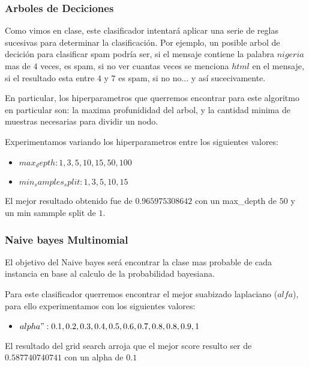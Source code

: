 \subsubsection{Arboles de Deciciones}

Como vimos en clase, este clasificador intentará aplicar una serie de reglas sucesivas para determinar la clasificación. Por ejemplo, un posible arbol de decición para clasificar spam podría ser, si el mensaje contiene la palabra $nigeria$ mas de $4$ veces, es spam, si no ver cuantas veces se menciona $html$ en el mensaje, si el resultado esta entre $4$ y $7$ es spam, si no no... y así sucecivamente.

En particular, los hiperparametros que querremos encontrar para este algoritmo en particular son: la maxima profunididad del arbol, y la cantidad minima de muestras necesarias para dividir un nodo.

Experimentamos variando los hiperparametros entre los siguientes valores:

\begin{itemize}
\item $max_depth: 1,3,5,10,15,50,100$ 
\item $min_samples_split: 1,3,5,10,15$
\end{itemize}

El mejor resultado obtenido fue de $0.965975308642$ con un max_depth de $50$ y un min sammple split de $1$.

\terminar


\subsubsection{Naive bayes Multinomial}

El objetivo del Naive bayes será encontrar la clase mas probable de cada instancia en base al calculo de la probabilidad bayesiana. 

Para este clasificador querremos encontrar el mejor suabizado laplaciano ($alfa$), para ello experimentamos con los siguientes valores:
\begin{itemize}
\item $alpha": 0.1,0.2,0.3,0.4,0.5,0.6,0.7,0.8,0.8,0.9,1$
\end{itemize}

El resultado del grid search arroja que el mejor score resulto ser de $0.587740740741$ con un alpha de $0.1$


